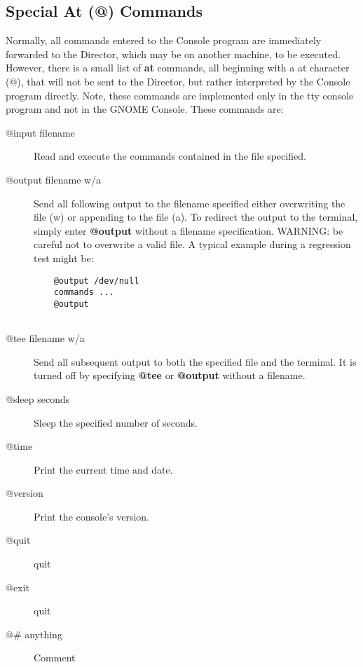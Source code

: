 \label{atcommands}

\subsection*{Special At (@) Commands}

Normally, all commands entered to the Console program are immediately
forwarded to the Director, which may be on another machine, to be executed.
However, there is a small list of {\bf at} commands, all beginning with a at
character (@), that will not be sent to the Director, but rather interpreted
by the Console program directly. Note, these commands are implemented only in
the tty console program and not in the GNOME Console. These commands are: 

\begin{description}

\item [@input \lt{}filename\gt{}]
   Read and execute the commands  contained in the file specified.  

\item [@output \lt{}filename\gt{} w/a]
   Send all following output to the  filename specified either overwriting the
file (w) or appending to  the file (a). To redirect the output to the
terminal, simply enter  {\bf @output} without a filename specification.
WARNING: be careful  not to overwrite a valid file. A typical example during a
regression  test might be:  

\footnotesize
\begin{verbatim}
    @output /dev/null
    commands ...
    @output
    
\end{verbatim}
\normalsize

\item [@tee \lt{}filename\gt{} w/a]
   Send all subsequent output to  both the specified file and the terminal. It is
turned off by  specifying {\bf @tee} or {\bf @output} without a filename.  

\item [@sleep \lt{}seconds\gt{}]
   Sleep the specified number of seconds.  

\item [@time]
   Print the current time and date.  

\item [@version]
   Print the console's version.  

\item [@quit]
   quit  

\item [@exit]
   quit  

\item [@\# anything]
   Comment 
\end{description}

